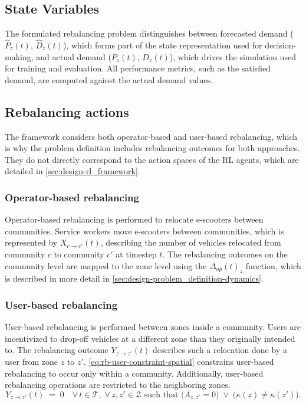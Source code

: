 \subsection{State Variables}\label{sec:design-problem_definition-states}
The formulated rebalancing problem distinguishes between forecasted demand ($\hat P_z(t)$, $\hat D_z(t)$), which forms part of the state representation used for decision-making, and actual demand ($P_z(t)$, $D_z(t)$), which drives the simulation used for training and evaluation.
All performance metrics, such as the satisfied demand, are computed against the actual demand values.

\subsection{Rebalancing actions}\label{sec:design-problem_definition-actions}
The framework considers both operator-based and user-based rebalancing, which is why the problem definition includes rebalancing outcomes for both approaches.
They do not directly correspond to the action spaces of the RL agents, which are detailed in \autoref{sec:design-rl_framework}.

\subsubsection{Operator-based rebalancing}
Operator-based rebalancing is performed to relocate e-scooters between communities.
Service workers move e-scooters between communities, which is represented by $X_{c\rightarrow c'}(t)$, describing the number of vehicles relocated from community $c$ to community $c'$ at timestep $t$.
The rebalancing outcomes on the community level are mapped to the zone level using the $\Delta_{op}(t)_z$ function, which is described in more detail in \autoref{sec:design-problem_definition-dynamics}.

\subsubsection{User-based rebalancing}
User-based rebalancing is performed between zones inside a community.
Users are incentivized to drop-off vehicles at a different zone than they originally intended to.
The rebalancing outcome $Y_{z\rightarrow z'}(t)$ describes such a relocation done by a user from zone $z$ to $z'$.
\autoref{eq:rb-user-constraint-spatial} constrains user-based rebalancing to occur only within a community.
Additionally, user-based rebalancing operations are restricted to the neighboring zones.
\begin{equation}\label{eq:rb-user-constraint-spatial}
Y_{z\to z'}(t) \;=\; 0
\quad
\forall\,t\in\mathcal{T},\;\forall\,z,z'\in\mathcal{Z}
\text{ such that }
\bigl(A_{z,z'}=0\bigr)\;\lor\;\bigl(\kappa(z)\neq\kappa(z')\bigr).
\end{equation}

